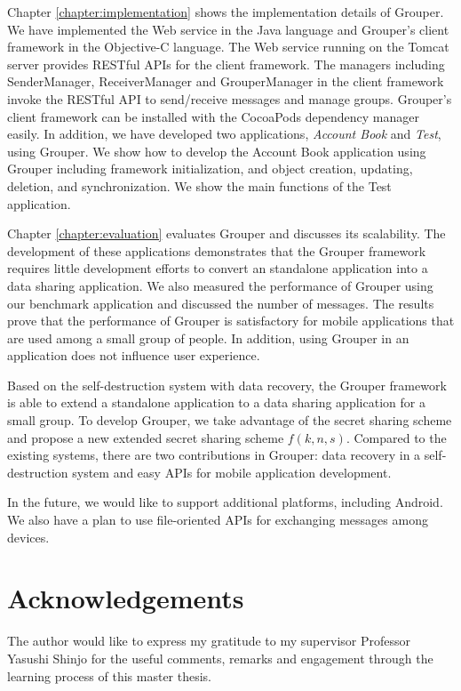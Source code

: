 \documentclass[a4paper,11pt]{report}
\begin{document}
Chapter \ref{chapter:implementation} shows the implementation details of Grouper.
We have implemented the Web service in the Java language and Grouper's client framework in the Objective-C language.
The Web service running on the Tomcat server provides RESTful APIs for the client framework. 
The managers including SenderManager, ReceiverManager and GrouperManager in the client framework invoke the RESTful API to send/receive messages and manage groups.
Grouper's client framework can be installed with the CocoaPods dependency manager easily.
In addition, we have developed two applications, \emph{Account Book} and \emph{Test}, using Grouper.
We show how to develop the Account Book application using Grouper including framework initialization, and object creation, updating, deletion, and synchronization.
We show the main functions of the Test application.

Chapter \ref{chapter:evaluation} evaluates Grouper and discusses its scalability.
The development of these applications demonstrates that the Grouper framework requires little development efforts to convert an standalone application into a data sharing application.
We also measured the performance of Grouper using our benchmark application and discussed the number of messages.
The results prove that the performance of Grouper is satisfactory for mobile applications that are used among a small group of people.
In addition, using Grouper in an application does not influence user experience.

Based on the self-destruction system with data recovery, the Grouper framework is able to extend a standalone application to a data sharing application for a small group.
To develop Grouper, we take advantage of the secret sharing scheme and propose a new extended secret sharing scheme $f(k, n, s)$.
Compared to the existing systems, there are two contributions in Grouper: data recovery in a self-destruction system and easy APIs for mobile application development.

In the future, we would like to support additional platforms, including Android.
We also have a plan to use file-oriented APIs for exchanging messages among devices.

\chapter*{Acknowledgements}

The author would like to express my gratitude to my supervisor Professor Yasushi Shinjo for the useful comments, remarks and engagement through the learning process of this master thesis.
\end{document}
